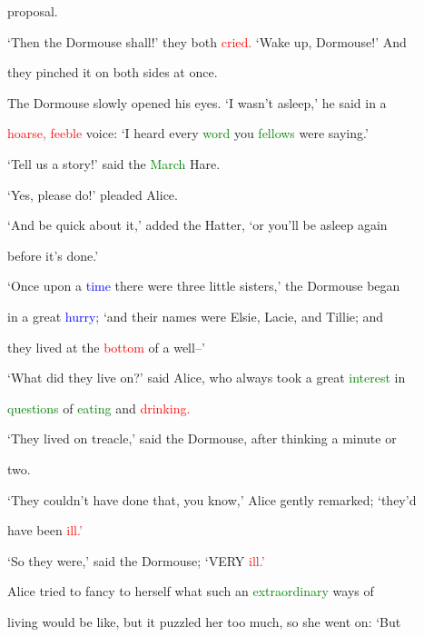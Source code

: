  proposal.



 ‘Then the Dormouse shall!’ they both \textcolor{red}{cried.} ‘Wake up, Dormouse!’ And

 they pinched it on both sides at once.



 The Dormouse slowly opened his eyes. ‘I wasn’t asleep,’ he said in a

 \textcolor{red}{hoarse,} \textcolor{red}{feeble} voice: ‘I heard every \textcolor{green}{word} you \textcolor{green}{fellows} were saying.’



 ‘Tell us a story!’ said the \textcolor{green}{March} Hare.



 ‘Yes, please do!’ pleaded Alice.



 ‘And be quick about it,’ added the Hatter, ‘or you’ll be asleep again

 before it’s done.’



 ‘Once upon a \textcolor{blue}{time} there were three little sisters,’ the Dormouse began

 in a great \textcolor{blue}{hurry;} ‘and their names were Elsie, Lacie, and Tillie; and

 they lived at the \textcolor{red}{bottom} of a well--’



 ‘What did they live on?’ said Alice, who always took a great \textcolor{green}{interest} in

 \textcolor{green}{questions} of \textcolor{green}{eating} and \textcolor{red}{drinking.}



 ‘They lived on treacle,’ said the Dormouse, after thinking a minute or

 two.



 ‘They couldn’t have done that, you know,’ Alice gently remarked; ‘they’d

 have been \textcolor{red}{ill.’}



 ‘So they were,’ said the Dormouse; ‘VERY \textcolor{red}{ill.’}



 Alice tried to \textcolor{BurntOrange}{fancy} to herself what such an \textcolor{green}{extraordinary} ways of

 living would be like, but it puzzled her too much, so she went on: ‘But


